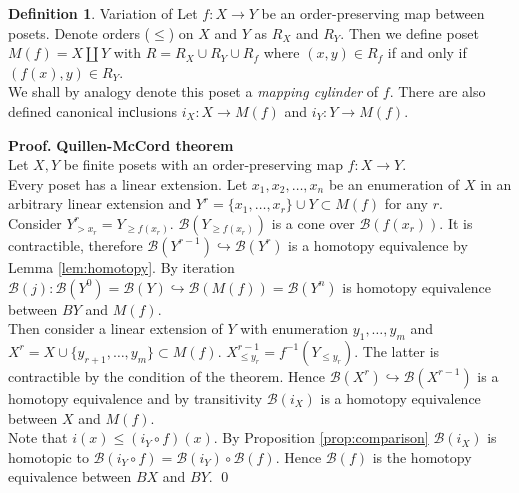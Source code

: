 \documentclass[a4paper, 12pt]{article}
\newcounter{stmcounter}[section]
\numberwithin{equation}{section}
\theoremstyle{definition}
\newtheorem{definition}[stmcounter]{Definition}
\theoremstyle{remark}
\newenvironment{pf}{\noindent\textbf{Proof.}}{\qed}
\newcommand{\define}[1]{{\textit{#1}}}
\renewcommand{\leq}{\leqslant}
\renewcommand{\geq}{\geqslant}
\begin{document}
\begin{definition} {Variation of \cite[Proposition 2.1]{Bar11}}
  Let $f : X \to Y$ be an order-preserving map between posets. Denote orders ($\leq$) on $X$ and $Y$ as $R_X$ and $R_Y$. Then we define poset $M(f) = X \coprod Y$ with $R = R_X \cup R_Y \cup R_{f}$ where $(x,y) \in R_f$ if and only if $(f(x),y) \in R_Y$.\\

  We shall by analogy denote this poset a \define{mapping cylinder} of $f$. There are also defined canonical inсlusions $i_X : X \to M(f)$ and $i_Y : Y \to M(f)$.
\end{definition}

\begin{pf} \textbf{Quillen-McCord theorem}\\
  Let $X, Y$ be finite posets with an order-preserving map $f : X \to Y$.\\

  Every poset has a linear extension. Let $x_1, x_2, \ldots, x_n$ be an enumeration of $X$ in an arbitrary linear extension and $Y^r = \{x_1,\ldots,x_r\} \cup Y \subset M(f)$ for any $r$.\\

  Consider $Y^r_{>x_r} = Y_{\geq f(x_r)}$. $\mathcal{B}(Y_{\geq f(x_r)})$ is a cone over $\mathcal{B}(f(x_r))$. It is contractible, therefore $\mathcal{B}(Y^{r-1}) \hookrightarrow \mathcal{B}(Y^{r})$ is a homotopy equivalence by Lemma \ref{lem:homotopy}. By iteration $\mathcal{B}(j) : \mathcal{B}(Y^{0}) = \mathcal{B}(Y) \hookrightarrow \mathcal{B}(M(f)) = \mathcal{B}(Y^n)$ is homotopy equivalence between $BY$ and $M(f)$.\\

  Then consider a linear extension of $Y$ with enumeration $y_1,\ldots,y_m$ and $X^r = X \cup \{y_{r+1},\ldots,y_m\} \subset M(f)$. $X^{r-1}_{\leq y_r} = f^{-1}(Y_{\leqslant y_r})$. The latter is contractible by the condition of the theorem. Hence $\mathcal{B}(X^{r}) \hookrightarrow \mathcal{B}(X^{r-1})$ is a homotopy equivalence and by transitivity $\mathcal{B}(i_X)$ is a homotopy equivalence between $X$ and $M(f)$.\\

  Note that $i(x) \leqslant (i_Y \circ f)(x)$. By Proposition \ref{prop:comparison} $\mathcal{B}(i_X)$ is homotopic to $\mathcal{B}(i_Y \circ f) = \mathcal{B}(i_Y) \circ \mathcal{B}(f)$. Hence $\mathcal{B}(f)$ is the homotopy equivalence between $BX$ and $BY$.
\end{pf}
\end{document}
